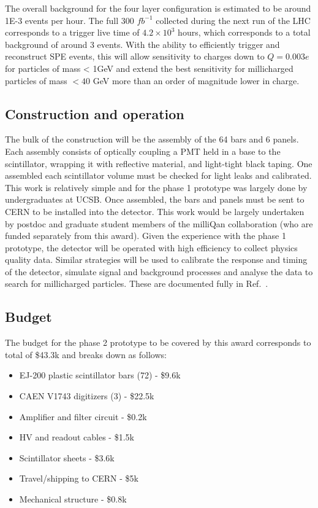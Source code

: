 \documentclass[11pt]{article}
\theoremstyle{plain} \numberwithin{equation}{section}
\theoremstyle{definition}
\begin{document}
The overall background for the four layer configuration is 
estimated to be around 1E-3 events per hour. The full 300 $fb^{-1}$ 
collected during the next run of the LHC corresponds to a trigger live time of $4.2\times 10^3$ hours, which
corresponds to a total background of around 3 events. With the ability to efficiently trigger
and reconstruct SPE events, this will allow sensitivity to charges down to $Q=0.003 e$ for particles of
mass < 1GeV and extend the best sensitivity for millicharged particles of mass $< 40$ GeV more than
an order of magnitude lower in charge.

\subsection*{Construction and operation}

The bulk of the construction will be the assembly of the 64 bars and 6 panels.
Each assembly consists of optically coupling a PMT held in a base
to the scintillator, wrapping it with reflective material, and light-tight black
taping. One assembled each scintillator volume must be checked for light leaks and calibrated.
This work is relatively simple and for the phase 1 prototype was largely 
done by undergraduates at UCSB. Once assembled, the bars and panels
must be sent to CERN to be installed into the detector. This work would be largely 
undertaken by postdoc and graduate student members of the milliQan collaboration 
(who are funded separately from this award). Given the experience with the phase 1 
prototype, the detector will be operated with high efficiency to collect physics quality
data. Similar strategies will be used to calibrate the response and timing of the 
detector, simulate signal and background processes and analyse the data to 
search for millicharged particles. These
are documented fully in Ref.~\cite{ball2020search}.

\subsection*{Budget}

The budget for the phase 2 prototype to be covered by this award corresponds to total of \$43.3k and
breaks down as follows:

\begin{itemize}
    \item EJ-200 plastic scintillator bars (72) - \$9.6k
    \item CAEN V1743 digitizers (3) - \$22.5k
    \item Amplifier and filter circuit  - \$0.2k
    \item HV and readout cables - \$1.5k
    \item Scintillator sheets - \$3.6k
    \item Travel/shipping to CERN - \$5k
    \item Mechanical structure - \$0.8k
\end{itemize}
\end{document}
